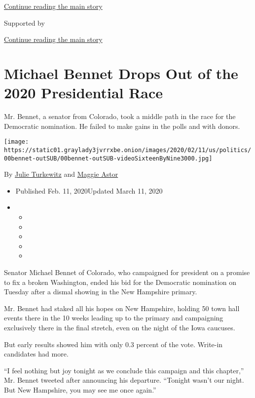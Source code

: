 \protect\hyperlink{after-top}{Continue reading the main story}

Supported by

\protect\hyperlink{after-sponsor}{Continue reading the main story}

\hypertarget{michael-bennet-drops-out-of-the-2020-presidential-race}{%
\section{Michael Bennet Drops Out of the 2020 Presidential
Race}\label{michael-bennet-drops-out-of-the-2020-presidential-race}}

Mr. Bennet, a senator from Colorado, took a middle path in the race for
the Democratic nomination. He failed to make gains in the polls and with
donors.

\texttt{[image: https://static01.graylady3jvrrxbe.onion/images/2020/02/11/us/politics/00bennet-outSUB/00bennet-outSUB-videoSixteenByNine3000.jpg]}

By \href{https://www.nytimes3xbfgragh.onion/by/julie-turkewitz}{Julie
Turkewitz} and
\href{https://www.nytimes3xbfgragh.onion/by/maggie-astor}{Maggie Astor}

\begin{itemize}
\item
  Published Feb. 11, 2020Updated March 11, 2020
\item
  \begin{itemize}
  \item
  \item
  \item
  \item
  \item
  \end{itemize}
\end{itemize}

Senator Michael Bennet of Colorado, who campaigned for president on a
promise to fix a broken Washington, ended his bid for the Democratic
nomination on Tuesday after a dismal showing in the New Hampshire
primary.

Mr. Bennet had staked all his hopes on New Hampshire, holding 50 town
hall events there in the 10 weeks leading up to the primary and
campaigning exclusively there in the final stretch, even on the night of
the Iowa caucuses.

But early results showed him with only 0.3 percent of the vote. Write-in
candidates had more.

``I feel nothing but joy tonight as we conclude this campaign and this
chapter,'' Mr. Bennet tweeted after announcing his departure. ``Tonight
wasn't our night. But New Hampshire, you may see me once again.''

